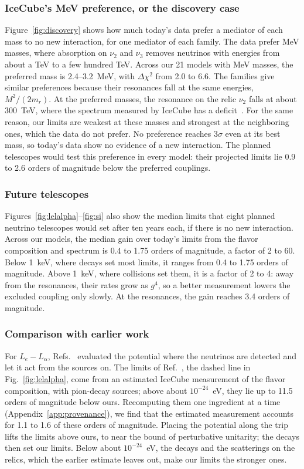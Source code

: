 \documentclass[linenumbers, aps, prd, twocolumn, superscriptaddress, floatfix, longbibliography, nofootinbib, bibnotes]{revtex4-2}
\begin{document}
\subsubsection{IceCube's MeV preference, or the discovery case}
Figure~\ref{fig:discovery} shows how much today's data prefer a mediator of each mass to no new interaction, for one mediator of each family.
The data prefer MeV masses, where absorption on $\nu_2$ and $\nu_3$ removes neutrinos with energies from about a TeV to a few hundred TeV.
Across our 21 models with MeV masses, the preferred mass is 2.4--3.2~MeV, with $\Delta\chi^2$ from 2.0 to 6.6.
The families give similar preferences because their resonances fall at the same energies, $M^2/(2m_r)$.
At the preferred masses, the resonance on the relic $\nu_2$ falls at about 300~TeV, where the spectrum measured by IceCube has a deficit~\cite{IceCube:2025ewu}.
For the same reason, our limits are weakest at these masses and strongest at the neighboring ones, which the data do not prefer.
No preference reaches $3\sigma$ even at its best mass, so today's data show no evidence of a new interaction.
The planned telescopes would test this preference in every model: their projected limits lie 0.9 to 2.6 orders of magnitude below the preferred couplings.

\subsubsection{Future telescopes}
Figures~\ref{fig:lelalpha}--\ref{fig:si} also show the median limits that eight planned neutrino telescopes would set after ten years each, if there is no new interaction.
Across our models, the median gain over today's limits from the flavor composition and spectrum is 0.4 to 1.75 orders of magnitude, a factor of 2 to 60.
Below 1~keV, where decays set most limits, it ranges from 0.4 to 1.75 orders of magnitude.
Above 1~keV, where collisions set them, it is a factor of 2 to 4: away from the resonances, their rates grow as $g^4$, so a better measurement lowers the excluded coupling only slowly.
At the resonances, the gain reaches 3.4 orders of magnitude.

\subsubsection{Comparison with earlier work}
For $L_e - L_\alpha$, Refs.~\cite{Bustamante:2018mzu, Agarwalla:2023sng} evaluated the potential where the neutrinos are detected and let it act from the sources on.
The limits of Ref.~\cite{Agarwalla:2023sng}, the dashed line in Fig.~\ref{fig:lelalpha}, come from an estimated IceCube measurement of the flavor composition, with pion-decay sources; above about $10^{-24}$~eV, they lie up to 11.5 orders of magnitude below ours.
Recomputing them one ingredient at a time (Appendix~\ref{app:provenance}), we find that the estimated measurement accounts for 1.1 to 1.6 of these orders of magnitude.
Placing the potential along the trip lifts the limits above ours, to near the bound of perturbative unitarity; the decays then set our limits.
Below about $10^{-24}$~eV, the decays and the scatterings on the relics, which the earlier estimate leaves out, make our limits the stronger ones.
\end{document}
